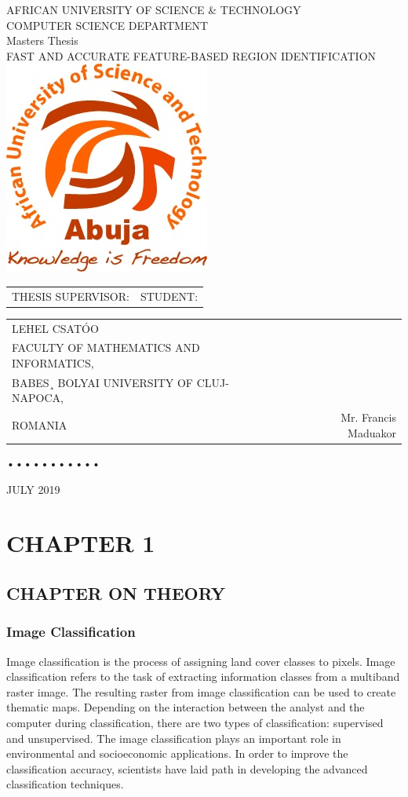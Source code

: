 \documentclass{article}
\begin{document}
\begin{center}
AFRICAN UNIVERSITY OF SCIENCE \& TECHNOLOGY \\
COMPUTER SCIENCE DEPARTMENT \\
Masters Thesis \\
FAST AND ACCURATE FEATURE-BASED REGION IDENTIFICATION\\
\includegraphics{images/logo.jpg}
\end{center}

\noindent
\begin{tabular}{lr}
THESIS SUPERVISOR:	&      STUDENT: 
\end{tabular}

\begin{tabular}{lr}
LEHEL CSATÓO\\ 
FACULTY OF MATHEMATICS AND INFORMATICS,\\
BABES¸ BOLYAI UNIVERSITY OF CLUJ-NAPOCA,\\
ROMANIA
&
Mr. Francis Maduakor
\end{tabular}
•••••••••••
\begin{center}
   JULY 2019 
\end{center}

\clearpage 
\tableofcontents
\clearpage

\section{CHAPTER 1}
\subsection{CHAPTER ON THEORY}
\subsubsection{Image Classification}
Image classification is the process of assigning land cover classes to pixels. Image classification refers to the task of extracting information classes from a multiband raster image. The resulting raster from image classification can be used to create thematic maps. Depending on the interaction between the analyst and the computer during classification, there are two types of classification: supervised and unsupervised. The image classification plays an important role in environmental and socioeconomic applications. In order to improve the classification accuracy, scientists have laid path in developing the advanced classification techniques.
\end{document}
